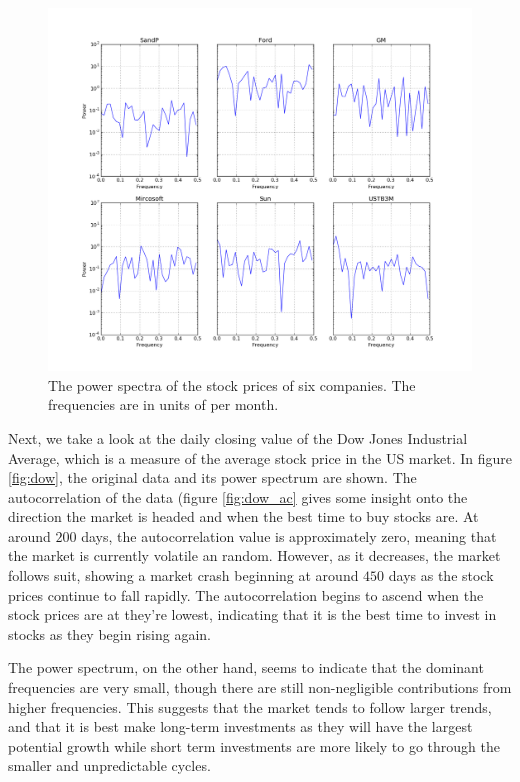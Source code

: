\message{ !name(Assn2.tex)}\documentclass[twocolumn]{article}
\begin{document}
\begin{figure}
  \includegraphics[width=\linewidth]{stocks_power_spectrum.png}
  \caption{
    The power spectra of the stock prices of six companies. The frequencies are
    in units of per month.
  }
  \label{fig:stocks_ps}
\end{figure}

Next, we take a look at the daily closing value of the Dow Jones
Industrial Average, which is a measure of the average stock price in
the US market. In figure \ref{fig:dow}, the original data and its
power spectrum are shown. The autocorrelation of the data (figure
\ref{fig:dow_ac} gives some insight onto the direction the market is
headed and when the best time to buy stocks are. At around $200$ days,
the autocorrelation value is approximately zero, meaning that the
market is currently volatile an random. However, as it decreases, the
market follows suit, showing a market crash beginning at around $450$
days as the stock prices continue to fall rapidly. The autocorrelation
begins to ascend when the stock prices are at they're lowest,
indicating that it is the best time to invest in stocks as they begin
rising again.

The power spectrum, on the other hand, seems to indicate
that the dominant frequencies are very small, though there are still
non-negligible contributions from higher frequencies. This suggests
that the market tends to follow larger trends, and that it is best
make long-term investments as they will have the largest potential
growth while short term investments are more likely to go through the
smaller and unpredictable cycles.
\end{document}
